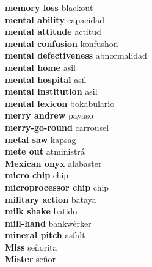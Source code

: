 \textbf{ memory loss  } blackout \\
\textbf{ mental ability  } capacidad \\
\textbf{ mental attitude  } actitud \\
\textbf{ mental confusion  } konfushon \\
\textbf{ mental defectiveness  } abnormalidad \\
\textbf{ mental home  } asil \\
\textbf{ mental hospital  } asil \\
\textbf{ mental institution  } asil \\
\textbf{ mental lexicon  } bokabulario \\
\textbf{ merry andrew  } payaso \\
\textbf{ merry-go-round  } carrousel \\
\textbf{ metal saw  } kapsag \\
\textbf{ mete out  } atministrá \\
\textbf{ Mexican onyx  } alabaster \\
\textbf{ micro chip  } chip \\
\textbf{ microprocessor chip  } chip \\
\textbf{ military action  } bataya \\
\textbf{ milk shake  } batido \\
\textbf{ mill-hand  } bankwèrker \\
\textbf{ mineral pitch  } asfalt \\
\textbf{ Miss  } señorita \\
\textbf{ Mister  } señor \\
